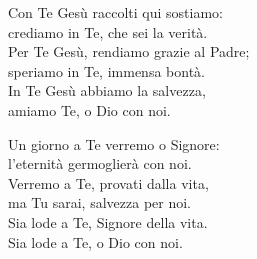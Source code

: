 
\strofa Con Te Gesù raccolti qui sostiamo:\\
crediamo in Te, che sei la verità.\\
Per Te Gesù, rendiamo grazie al Padre;\\
speriamo in Te, immensa bontà.\\
In Te Gesù abbiamo la salvezza,\\
amiamo Te, o Dio con noi.

\spazio

\strofa Un giorno a Te verremo o Signore:\\
l'eternità germoglierà con noi.\\
Verremo a Te, provati dalla vita,\\
ma Tu sarai, salvezza per noi.\\
Sia lode a Te, Signore della vita.\\
Sia lode a Te, o Dio con noi.